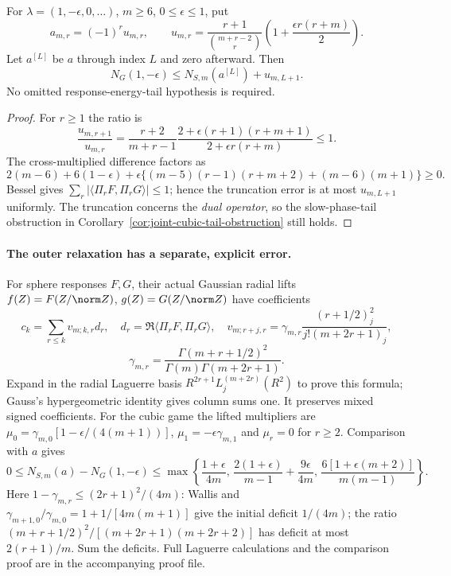 \begin{corollary}
\label{cor:spherical-dual-cubic-tail}
For $\lambda=(1,-\epsilon,0,\ldots)$, $m\ge6$, $0\le\epsilon\le1$, put
\[
 a_{m,r}=(-1)^ru_{m,r},\qquad
 u_{m,r}=\frac{r+1}{\binom{m+r-2}{r}}
       \left(1+\frac{\epsilon r(r+m)}2\right).
\]
Let $a^{[L]}$ be $a$ through index $L$ and zero afterward. Then
\begin{equation}\label{eq:spherical-dual-cubic-cap}
 \boxed{N_G(1,-\epsilon)\le N_{S,m}(a^{[L]})+u_{m,L+1}.}
\end{equation}
No omitted response-energy-tail hypothesis is required.
\end{corollary}
\begin{proof}
For $r\ge1$ the ratio is
\[
 \frac{u_{m,r+1}}{u_{m,r}}=
 \frac{r+2}{m+r-1}
 \frac{2+\epsilon(r+1)(r+m+1)}{2+\epsilon r(r+m)}\le1.
\]
The cross-multiplied difference factors as
\[
 2(m-6)+6(1-\epsilon)+
 \epsilon\{(m-5)(r-1)(r+m+2)+(m-6)(m+1)\}\ge0.
\]
Bessel gives $\sum_r|\langle\Pi_rF,\Pi_rG\rangle|\le1$;
hence the truncation error is at most $u_{m,L+1}$ uniformly.
The truncation concerns the \emph{dual operator}, so the slow-phase-tail
obstruction in Corollary~\ref{cor:joint-cubic-tail-obstruction} still holds.
\end{proof}

\paragraph{The outer relaxation has a separate, explicit error.}
For sphere responses $F,G$, their actual Gaussian radial lifts
$f(Z)=F(Z/\norm Z)$, $g(Z)=G(Z/\norm Z)$ have coefficients
\[
 c_k=\sum_{r\le k}v_{m;k,r}d_r,\quad
 d_r=\Re\langle\Pi_rF,\Pi_rG\rangle,\quad
 v_{m;r+j,r}=\gamma_{m,r}
 \frac{(r+1/2)_j^2}{j!(m+2r+1)_j},
\]
\[
 \gamma_{m,r}=\frac{\Gamma(m+r+1/2)^2}
 {\Gamma(m)\Gamma(m+2r+1)}.
\]
Expand in the radial Laguerre basis
$R^{2r+1}L_j^{(m+2r)}(R^2)$ to prove this formula; Gauss's
hypergeometric identity gives column sums one. It preserves mixed
signed coefficients. For the cubic game the lifted multipliers are
$\mu_0=\gamma_{m,0}[1-\epsilon/(4(m+1))]$,
$\mu_1=-\epsilon\gamma_{m,1}$ and $\mu_r=0$ for $r\ge2$.
Comparison with $a$ gives
\begin{equation}\label{eq:spherical-dual-outer-error}
 0\le N_{S,m}(a)-N_G(1,-\epsilon)\le
 \max\left\{\frac{1+\epsilon}{4m},\,
 \frac{2(1+\epsilon)}{m-1}+\frac{9\epsilon}{4m},\,
 \frac{6[1+\epsilon(m+2)]}{m(m-1)}\right\}.
\end{equation}
Here $1-\gamma_{m,r}\le(2r+1)^2/(4m)$: Wallis and
$\gamma_{m+1,0}/\gamma_{m,0}=1+1/[4m(m+1)]$ give the initial
deficit $1/(4m)$; the ratio
$(m+r+1/2)^2/[(m+2r+1)(m+2r+2)]$ has deficit at most
$2(r+1)/m$. Sum the deficits. Full Laguerre calculations and the
comparison proof are in the accompanying proof file.

